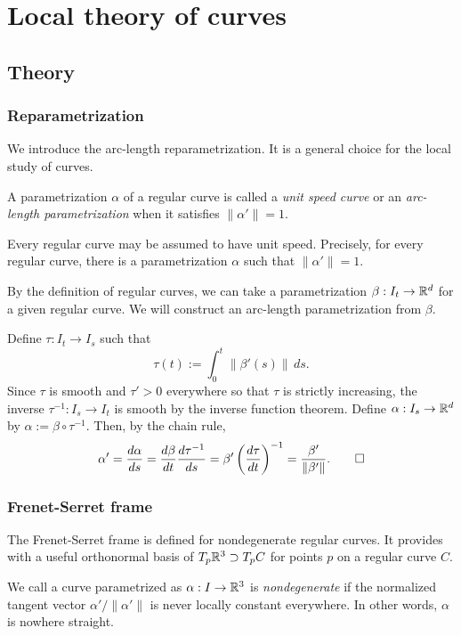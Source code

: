 \documentclass{../exp}
\def\a{\alpha}
\begin{document}









\section{Local theory of curves}

\subsection{Theory}

\subsubsection{Reparametrization}

We introduce the arc-length reparametrization.
It is a general choice for the local study of curves.
\begin{defn}
A parametrization $\a$ of a regular curve is called a \emph{unit speed curve} or an \emph{arc-length parametrization} when it satisfies $\|\a'\|=1$.
\end{defn}
\begin{thm}
Every regular curve may be assumed to have unit speed.
Precisely, for every regular curve, there is a parametrization $\a$ such that $\|\a'\|=1$.
\end{thm}
\begin{pf}
By the definition of regular curves, we can take a parametrization $\beta:I_t\to\R^d$ for a given regular curve.
We will construct an arc-length parametrization from $\beta$.

Define $\tau:I_t\to I_s$ such that
\[\tau(t):=\int_0^t\|\beta'(s)\|\,ds.\]
Since $\tau$ is smooth and $\tau'>0$ everywhere so that $\tau$ is strictly increasing, the inverse $\tau^{-1}:I_s\to I_t$ is smooth by the inverse function theorem.
Define $\a:I_s\to\R^d$ by $\a:=\beta\circ\tau^{-1}$.
Then, by the chain rule,
\[\a'=\dd{\a}{s}=\dd{\beta}{t}\dd{\tau^{-1}}{s}=\beta'\left(\dd{\tau}{t}\right)^{-1}=\frac{\beta'}{\|\beta'\|}.\qedhere\]
\end{pf}




\subsubsection{Frenet-Serret frame}
The Frenet-Serret frame is defined for nondegenerate regular curves.
It provides with a useful orthonormal basis of $T_p\mathbb{R}^3\supset T_pC$ for points $p$ on a regular curve $C$.
\begin{defn}
We call a curve parametrized as $\a:I\to\R^3$ is \emph{nondegenerate} if the normalized tangent vector $\a'/\|\a'\|$ is never locally constant everywhere.
In other words, $\a$ is nowhere straight.
\end{defn}
\end{document}
